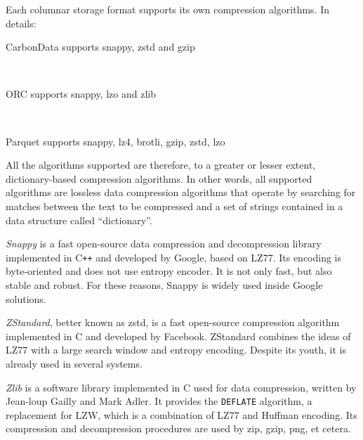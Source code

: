 \documentclass[10pt, a4paper]{report}
\begin{document}
Each columnar storage format supports its own compression algorithms. In details: \\

\begin{itemize}
	\begin{minipage}{0.92\textwidth}
		\item
		CarbonData supports snappy, zstd and gzip \\
	\end{minipage} \\
	\begin{minipage}{0.92\textwidth}
		\item
		ORC supports snappy, lzo and zlib \\
	\end{minipage} \\
	\begin{minipage}{0.92\textwidth}
		\item
		Parquet supports snappy, lz4, brotli\cite{google_brotli}, gzip, zstd, lzo \\
	\end{minipage}
\end{itemize}

All the algorithms supported are therefore, to a greater or lesser extent, dictionary-based compression algorithms. In other words, all supported algorithms are lossless data compression algorithms that operate by searching for matches between the text to be compressed and a set of strings contained in a data structure called ``dictionary''.

\textit{Snappy}\cite{google_snappy} is a fast open-source data compression and decompression library implemented in C\texttt{++} and developed by Google, based on LZ77. Its encoding is byte-oriented and does not use entropy encoder. It is not only fast, but also stable and robust. For these reasons, Snappy is widely used inside Google solutions.

\textit{ZStandard}\cite{facebook_zstd}, better known as zstd, is a fast open-source compression algorithm implemented in C and developed by Facebook. ZStandard combines the ideas of LZ77 with a large search window and entropy encoding. Despite its youth, it is already used in several systems.

\textit{Zlib}\cite{zlib} is a software library implemented in C used for data compression, written by Jean-loup Gailly and Mark Adler. It provides the \texttt{DEFLATE} algorithm, a replacement for LZW, which is a combination of LZ77 and Huffman encoding. Its compression and decompression procedures are used by zip, gzip, png, et cetera.
\end{document}
